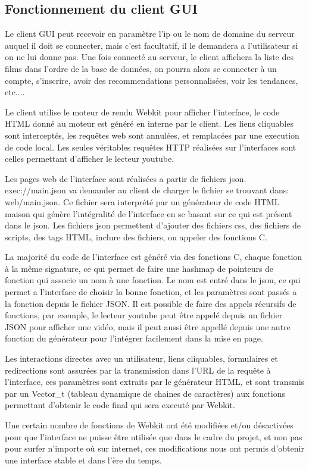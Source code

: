 % 
\subsection{Fonctionnement du client GUI}
Le client GUI peut recevoir en paramètre l'ip ou le nom de domaine du serveur auquel il doit se connecter, mais c'est facultatif, il le demandera a l'utilisateur si on ne lui donne pas. Une fois connecté au serveur, le client affichera la liste des films dans l'ordre de la base de données, on pourra alors se connecter à un compte, s'inscrire, avoir des recommendations personnalisées, voir les tendances, etc....\par
Le client utilise le moteur de rendu Webkit pour afficher l'interface, le code HTML donné au moteur est généré en interne par le client. Les liens cliquables sont interceptés, les requêtes web sont annulées, et remplacées par une execution de code local. Les seules véritables requêtes HTTP réalisées sur l'interfaces sont celles permettant d'afficher le lecteur youtube.\par
Les pages \og web \fg de l'interface sont réalisées a partir de fichiers json. exec://main.json va demander au client de charger le fichier se trouvant dans: web/main.json. Ce fichier sera interprété par un générateur de code HTML maison qui génère l'intégralité de l'interface en se basant sur ce qui est présent dans le json. Les fichiers json permettent d'ajouter des fichiers css, des fichiers de scripts, des tags HTML, inclure des fichiers, ou appeler des fonctions C.\par
La majorité du code de l'interface est généré via des fonctions C, chaque fonction à la même signature, ce qui permet de faire une hashmap de pointeurs de fonction qui associe un nom à une fonction. Le nom est entré dans le json, ce qui permet a l'interface de choisir la bonne fonction, et les paramètres sont passés a la fonction depuis le fichier JSON. Il est possible de faire des appels récursifs de fonctions, par exemple, le lecteur youtube peut être appelé depuis un fichier JSON pour afficher une vidéo, mais il peut aussi être appellé depuis une autre fonction du générateur pour l'intégrer facilement dans la mise en page.\par
Les interactions directes avec un utilisateur, liens cliquables, formulaires et redirections sont assurées par la transmission dans l'URL de la requête à l'interface, ces paramètres sont extraits par le générateur HTML, et sont transmis par un Vector\_t (tableau dynamique de chaines de caractères) aux fonctions permettant d'obtenir le code final qui sera executé par Webkit.\par
Une certain nombre de fonctions de Webkit ont été modifiées et/ou désactivées pour que l'interface ne puisse être utilisée que dans le cadre du projet, et non pas pour surfer n'importe où sur internet, ces modifications nous ont permis d'obtenir une interface stable et dans l'ère du temps.\par
% 
